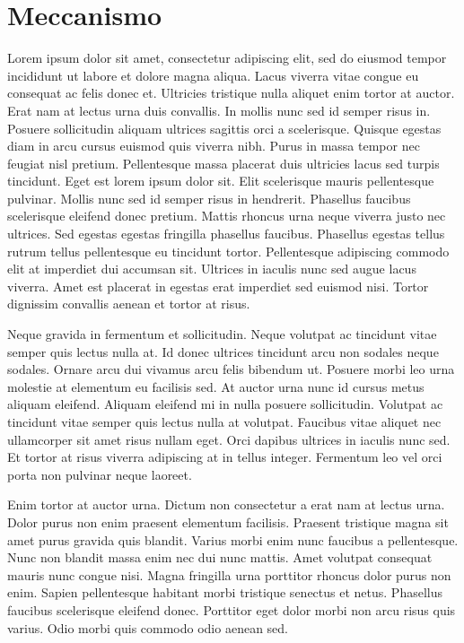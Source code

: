 \documentclass[a4]{report}
\begin{document}
\section{Meccanismo}
Lorem ipsum dolor sit amet, consectetur adipiscing elit, sed do eiusmod tempor incididunt ut labore et dolore magna aliqua. Lacus viverra vitae congue eu consequat ac felis donec et. Ultricies tristique nulla aliquet enim tortor at auctor. Erat nam at lectus urna duis convallis. In mollis nunc sed id semper risus in. Posuere sollicitudin aliquam ultrices sagittis orci a scelerisque. Quisque egestas diam in arcu cursus euismod quis viverra nibh. Purus in massa tempor nec feugiat nisl pretium. Pellentesque massa placerat duis ultricies lacus sed turpis tincidunt. Eget est lorem ipsum dolor sit. Elit scelerisque mauris pellentesque pulvinar. Mollis nunc sed id semper risus in hendrerit. Phasellus faucibus scelerisque eleifend donec pretium. Mattis rhoncus urna neque viverra justo nec ultrices. Sed egestas egestas fringilla phasellus faucibus. Phasellus egestas tellus rutrum tellus pellentesque eu tincidunt tortor. Pellentesque adipiscing commodo elit at imperdiet dui accumsan sit. Ultrices in iaculis nunc sed augue lacus viverra. Amet est placerat in egestas erat imperdiet sed euismod nisi. Tortor dignissim convallis aenean et tortor at risus.

Neque gravida in fermentum et sollicitudin. Neque volutpat ac tincidunt vitae semper quis lectus nulla at. Id donec ultrices tincidunt arcu non sodales neque sodales. Ornare arcu dui vivamus arcu felis bibendum ut. Posuere morbi leo urna molestie at elementum eu facilisis sed. At auctor urna nunc id cursus metus aliquam eleifend. Aliquam eleifend mi in nulla posuere sollicitudin. Volutpat ac tincidunt vitae semper quis lectus nulla at volutpat. Faucibus vitae aliquet nec ullamcorper sit amet risus nullam eget. Orci dapibus ultrices in iaculis nunc sed. Et tortor at risus viverra adipiscing at in tellus integer. Fermentum leo vel orci porta non pulvinar neque laoreet.

Enim tortor at auctor urna. Dictum non consectetur a erat nam at lectus urna. Dolor purus non enim praesent elementum facilisis. Praesent tristique magna sit amet purus gravida quis blandit. Varius morbi enim nunc faucibus a pellentesque. Nunc non blandit massa enim nec dui nunc mattis. Amet volutpat consequat mauris nunc congue nisi. Magna fringilla urna porttitor rhoncus dolor purus non enim. Sapien pellentesque habitant morbi tristique senectus et netus. Phasellus faucibus scelerisque eleifend donec. Porttitor eget dolor morbi non arcu risus quis varius. Odio morbi quis commodo odio aenean sed.
\end{document}
